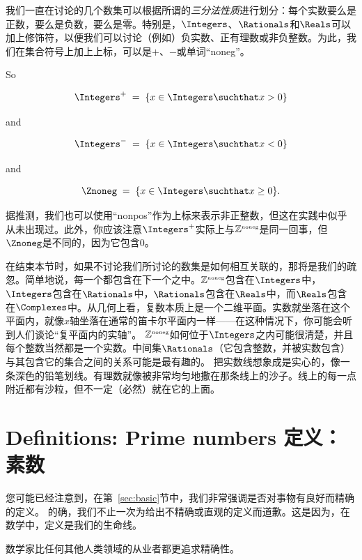 我们一直在讨论的几个数集可以根据所谓的\emph{三分法性质}进行划分：每个实数要么是正数，要么是负数，要么是零。特别是，$\Integers$、$\Rationals$和$\Reals$可以加上修饰符，以便我们可以讨论（例如）负实数、正有理数或非负整数。为此，我们在集合符号上加上上标，可以是$+$、$-$或单词“noneg”。

So

\[ \Integers^+ \; = \; \{ x \in \Integers \suchthat x > 0 \} \]

\noindent and

\[ \Integers^- \; = \; \{ x \in \Integers \suchthat x < 0 \} \]

\noindent and

\[ \Znoneg \; = \; \{ x \in \Integers \suchthat x \geq 0 \}. \]

据推测，我们也可以使用“nonpos”作为上标来表示非正整数，但这在实践中似乎从未出现过。此外，你应该注意$\Integers^+$实际上与${\mathbb Z}^{\mbox{\tiny noneg}}$是同一回事，但$\Znoneg$是不同的，因为它包含$0$。

在结束本节时，如果不讨论我们所讨论的数集是如何相互关联的，那将是我们的疏忽。简单地说，每一个都包含在下一个之中。${\mathbb Z}^{\mbox{\tiny noneg}}$包含在$\Integers$中，$\Integers$包含在$\Rationals$中，$\Rationals$包含在$\Reals$中，而$\Reals$包含在$\Complexes$中。从几何上看，复数本质上是一个二维平面。实数就坐落在这个平面内，就像$x$轴坐落在通常的笛卡尔平面内一样——在这种情况下，你可能会听到人们谈论“复平面内的实轴”。
${\mathbb Z}^{\mbox{\tiny noneg}}$如何位于$\Integers$之内可能很清楚，并且每个整数当然都是一个实数。中间集$\Rationals$（它包含整数，并被实数包含）与其包含它的集合之间的关系可能是最有趣的。
把实数线想象成是实心的，像一条深色的铅笔划线。有理数就像被非常均匀地撒在那条线上的沙子。线上的每一点附近都有沙粒，但不一定（必然）就在它的上面。

\newpage




\newpage

\section{Definitions: Prime numbers 定义：素数}
\label{sec:def}

您可能已经注意到，在第~\ref{sec:basic}节中，我们非常强调是否对事物有良好而精确的定义。
的确，我们不止一次为给出不精确或直观的定义而道歉。这是因为，在数学中，定义是我们的生命线。

数学家比任何其他人类领域的从业者都更追求精确性。

